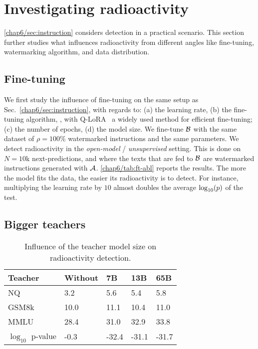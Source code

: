 
\section{Investigating radioactivity}\label{chap6/sec:fine-tuning-abl}

\autoref{chap6/sec:instruction} considers detection in a practical scenario.
This section further studies what influences radioactivity from different angles like fine-tuning, watermarking algorithm, and data distribution.


\subsection{Fine-tuning}




We first study the influence of fine-tuning on the same setup as Sec.~\ref{chap6/sec:instruction}, with regards to: 
(a) the learning rate,
(b) the fine-tuning algorithm,
\eg, with Q-LoRA~\citep{dettmers2023qlora} a widely used method for efficient fine-tuning;
(c) the number of epochs,
(d) the model size.
We fine-tune $\mathcal B$ with the same dataset of $\rho=100\%$ watermarked instructions and the same parameters.
We detect radioactivity in the \emph{open-model} / \emph{unsupervised} setting.
This is done on $N=10$k next-predictions, and where the texts that are fed to $\mathcal B$ are watermarked instructions generated with $\mathcal A$.
\autoref{chap6/tab:ft-abl} reports the results. The more the model fits the data, the easier its radioactivity is to detect.
For instance, multiplying the learning rate by $10$ almost doubles the average $\log_{10}(p)$ of the test.


\subsection{Bigger teachers}\label{chap6/app:bigger-teachers}

\begin{table}[t!]
    \centering
    \caption{
        Influence of the teacher model size on radioactivity detection.
    }
    \label{chap6/table:results_Teachers}
    \footnotesize
    \begin{tabular}{ *{5}{l} }
        \toprule
        Teacher & Without & 7B & 13B & 65B \\
        \midrule
        NQ & 3.2 & 5.6 & 5.4 & 5.8 \\
        GSM8k & 10.0 & 11.1 & 10.4 & 11.0 \\
        MMLU & 28.4 & 31.0 & 32.9 & 33.8 \\
        \midrule
        $\log_{10}$ p-value & -0.3 & -32.4 & -31.1 & -31.7 \\
        \bottomrule
    \end{tabular}
\end{table}

